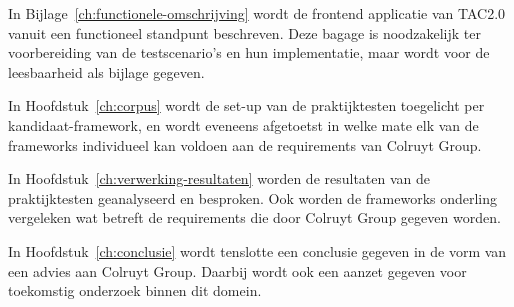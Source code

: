 In Bijlage~\ref{ch:functionele-omschrijving} wordt de frontend applicatie van TAC2.0 vanuit een functioneel standpunt beschreven. Deze bagage is noodzakelijk ter voorbereiding van de testscenario's en hun implementatie, maar wordt voor de leesbaarheid als bijlage gegeven.

In Hoofdstuk~\ref{ch:corpus} wordt de set-up van de praktijktesten toegelicht per kandidaat-framework, en wordt eveneens afgetoetst in welke mate elk van de frameworks individueel kan voldoen aan de requirements van Colruyt Group.

In Hoofdstuk~\ref{ch:verwerking-resultaten} worden de resultaten van de praktijktesten geanalyseerd en besproken. Ook worden de frameworks onderling vergeleken wat betreft de requirements die door Colruyt Group gegeven worden.

In Hoofdstuk~\ref{ch:conclusie} wordt tenslotte een conclusie gegeven in de vorm van een advies aan Colruyt Group. Daarbij wordt ook een aanzet gegeven voor toekomstig onderzoek binnen dit domein.